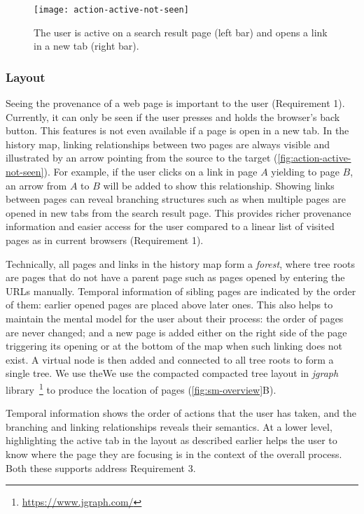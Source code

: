 \begin{figure}[!htb]
	\centering
	\texttt{[image: action-active-not-seen]}
	\caption{The user is active on a search result page (left bar) and opens a link in a new tab (right bar).}
	\label{fig:action-active-not-seen}
\end{figure}

\subsubsection{Layout}
\label{sub:sm-layout}
Seeing the provenance of a web page is important to the user (Requirement 1). Currently, it can only be seen if the user presses and holds the browser's back button. This features is not even available if a page is open in a new tab. In the history map, linking relationships between two pages are always visible and illustrated by an arrow pointing from the source to the target (\autoref{fig:action-active-not-seen}). For example, if the user clicks on a link in page $A$ yielding to page $B$, an arrow from $A$ to $B$ will be added to show this relationship. Showing links between pages can reveal branching structures such as when multiple pages are opened in new tabs from the search result page. This provides richer provenance information and easier access for the user compared to a linear list of visited pages as in current browsers (Requirement 1).

Technically, all pages and links in the history map form a \textit{forest}, where tree roots are pages that do not have a parent page such as pages opened by entering the URLs manually. Temporal information of sibling pages are indicated by the order of them: earlier opened pages are placed above later ones. This also helps to maintain the mental model for the user about their process: the order of pages are never changed; and a new page is added either on the right side of the page triggering its opening or at the bottom of the map when such linking does not exist. A virtual node is then added and connected to all tree roots to form a single tree. We use theWe use the compacted compacted tree layout in \textit{jgraph} library~\footnote{\url{https://www.jgraph.com/}} to produce the location of pages (\autoref{fig:sm-overview}B).

Temporal information shows the order of actions that the user has taken, and the branching and linking relationships reveals their semantics. At a lower level, highlighting the active tab in the layout as described earlier helps the user to know where the page they are focusing is in the context of the overall process. Both these supports address Requirement 3.

